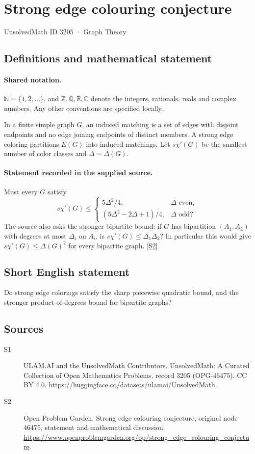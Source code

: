 \documentclass[11pt]{article}
\newcommand{\sref}[2]{\hyperlink{source:#1:#2}{[S#2]}}
\begin{document}
\setcounter{section}{3204}
\section{Strong edge colouring conjecture}\label{3205}
{\small\sffamily UnsolvedMath ID 3205 · Graph Theory}
\subsection{Definitions and mathematical statement}

\paragraph{Shared notation.}$\mathbb N=\{1,2,\ldots\}$, and $\mathbb Z,\mathbb Q,\mathbb R,\mathbb C$ denote the integers, rationals, reals and complex numbers. Any other conventions are specified locally.


In a finite simple graph $G$, an induced matching is a set of edges with disjoint endpoints and no edge joining endpoints of distinct members. A strong edge coloring partitions $E(G)$ into induced matchings. Let $s\chi'(G)$ be the smallest number of color classes and $\Delta=\Delta(G)$.
\paragraph{Statement recorded in the supplied source.}
Must every $G$ satisfy \[s\chi'(G)\le\begin{cases}5\Delta^2/4,&\Delta\text{ even},\\(5\Delta^2-2\Delta+1)/4,&\Delta\text{ odd}?\end{cases}\] The source also asks the stronger bipartite bound: if $G$ has bipartition $(A_1,A_2)$ with degrees at most $\Delta_i$ on $A_i$, is $s\chi'(G)\le\Delta_1\Delta_2$? In particular this would give $s\chi'(G)\le\Delta(G)^2$ for every bipartite graph. \sref{3205}{2}
\subsection{Short English statement}
Do strong edge colorings satisfy the sharp piecewise quadratic bound, and the stronger product-of-degrees bound for bipartite graphs?
\subsection{Sources}
\begin{description}
\item[\hypertarget{source:3205:1}{S1}] ULAM.AI and the UnsolvedMath Contributors, UnsolvedMath: A Curated Collection of Open Mathematics Problems, record 3205 (OPG-46475). CC BY 4.0. \url{https://huggingface.co/datasets/ulamai/UnsolvedMath}.
\item[\hypertarget{source:3205:2}{S2}] Open Problem Garden, Strong edge colouring conjecture, original node 46475, statement and mathematical discussion. \url{https://www.openproblemgarden.org/op/strong_edge_colouring_conjecture}.
\end{description}
\label{end:3205}
\end{document}
